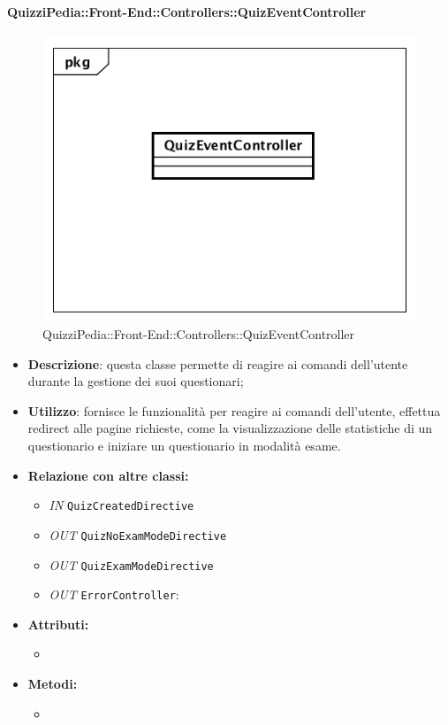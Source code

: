 \paragraph{QuizziPedia::Front-End::Controllers::QuizEventController}
\begin{figure}
	\centering
	\includegraphics[scale=0.45]{UML/Classi/Front-End/QuizziPedia_Front-end_Controller_QuizEventController.png}
	\caption{QuizziPedia::Front-End::Controllers::QuizEventController}
\end{figure}
\begin{itemize}
	\item \textbf{Descrizione}: questa classe permette di reagire ai comandi dell'utente durante la gestione dei suoi questionari;
	\item \textbf{Utilizzo}: fornisce le funzionalità per reagire ai comandi dell'utente, effettua redirect alle pagine richieste, come la visualizzazione delle statistiche di un questionario e iniziare un questionario in modalità esame.
	\item \textbf{Relazione con altre classi:}
	\begin{itemize}
		\item \textit{IN} \texttt{QuizCreatedDirective} 
		\item \textit{OUT} \texttt{QuizNoExamModeDirective} 
		\item \textit{OUT} \texttt{QuizExamModeDirective} 
		\item \textit{OUT} \texttt{ErrorController}: 
	\end{itemize}
	\item \textbf{Attributi:}
	\begin{itemize}
		\item 
	\end{itemize}
	\item \textbf{Metodi:}
	\begin{itemize}
		\item 
	\end{itemize}
\end{itemize}